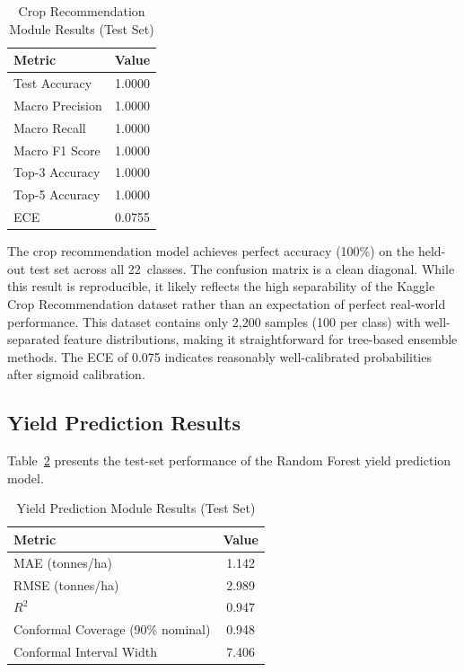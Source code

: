\documentclass[conference]{IEEEtran}
\begin{document}
\begin{table}[htbp]
  \centering
  \caption{Crop Recommendation Module Results (Test Set)}
  \label{tab:crop_results}
  \begin{tabular}{lc}
    \toprule
    \textbf{Metric} & \textbf{Value} \\
    \midrule
    Test Accuracy           & 1.0000 \\
    Macro Precision         & 1.0000 \\
    Macro Recall            & 1.0000 \\
    Macro F1 Score          & 1.0000 \\
    Top-3 Accuracy          & 1.0000 \\
    Top-5 Accuracy          & 1.0000 \\
    ECE                     & 0.0755 \\
    \bottomrule
  \end{tabular}
\end{table}

The crop recommendation model achieves perfect accuracy (100\%) on the held-out test set across all 22~classes. The confusion matrix is a clean diagonal. While this result is reproducible, it likely reflects the high separability of the Kaggle Crop Recommendation dataset rather than an expectation of perfect real-world performance. This dataset contains only 2,200 samples (100 per class) with well-separated feature distributions, making it straightforward for tree-based ensemble methods. The ECE of 0.075 indicates reasonably well-calibrated probabilities after sigmoid calibration.

\subsection{Yield Prediction Results}

Table~\ref{tab:yield_results} presents the test-set performance of the Random Forest yield prediction model.

\begin{table}[htbp]
  \centering
  \caption{Yield Prediction Module Results (Test Set)}
  \label{tab:yield_results}
  \begin{tabular}{lc}
    \toprule
    \textbf{Metric} & \textbf{Value} \\
    \midrule
    MAE (tonnes/ha)                   & 1.142 \\
    RMSE (tonnes/ha)                  & 2.989 \\
    $R^{2}$                           & 0.947 \\
    Conformal Coverage (90\% nominal) & 0.948 \\
    Conformal Interval Width          & 7.406 \\
    \bottomrule
  \end{tabular}
\end{table}
\end{document}

